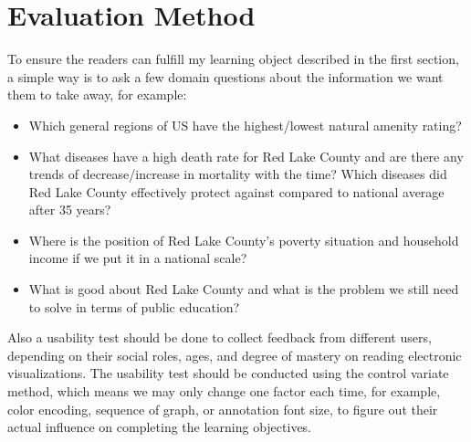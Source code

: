 \documentclass{article}
\begin{document}
\section{Evaluation Method}

To ensure the readers can fulfill my learning object described in the first section, a simple way is to ask a few domain questions about the information we want them to take away, for example:
\begin{itemize}
    \item Which general regions of US have the highest/lowest natural amenity rating?
    \item What diseases have a high death rate for Red Lake County and are there any trends of decrease/increase in mortality with the time? Which diseases did Red Lake County effectively protect against compared to national average after 35 years?
    \item Where is the position of Red Lake County's poverty situation and household income if we put it in a national scale?
    \item What is good about Red Lake County and what is the problem we still need to solve in terms of public education?
\end{itemize}

\noindent
Also a usability test should be done to collect feedback from different users, depending on their social roles, ages, and degree of mastery on reading electronic visualizations. The usability test should be conducted using the control variate method, which means we may only change one factor each time, for example, color encoding, sequence of graph, or annotation font size, to figure out their actual influence on completing the learning objectives.
\end{document}
